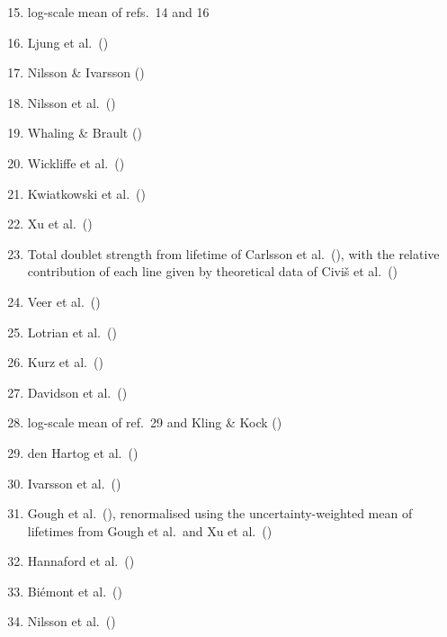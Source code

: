 \documentclass[traditabstract]{aa}
\begin{document}
\begin{minipage}[t]{0.43\linewidth}
\vspace{0pt}
\begin{enumerate}
\setcounter{enumi}{14}
\item log-scale mean of refs.\ 14 and 16
\item Ljung et al.\ (\cite{ljung})
\item Nilsson \& Ivarsson (\cite{nils2})
\item Nilsson et al.\ (\cite{nils})
\item Whaling \& Brault (\cite{whal2})
\item Wickliffe et al.\ (\cite{wick})
\item Kwiatkowski et al.\ (\cite{kwia1})
\item Xu et al.\ (\cite{xu})
\item Total doublet strength from lifetime of Carlsson et al.\ (\cite{carl2}), with the relative contribution of each line given by theoretical data of Civi\v{s} et al.\ (\cite{civis})
\item Veer et al.\ (\cite{veer})
\item Lotrian et al.\ (\cite{lotri})
\item Kurz et al.\ (\cite{Kurz})
\item Davidson et al.\ (\cite{davi})
\item log-scale mean of ref.\ 29 and Kling \& Kock (\cite{klin})  
\item den Hartog et al.\ (\cite{denh})
\item Ivarsson et al.\ (\cite{ivar})
\item Gough et al.\ (\cite{gough}), renormalised using the uncertainty-weighted mean of lifetimes from Gough et al.\ and Xu et al.\ (\cite{xu2})
\item Hannaford et al.\ (\cite{hann4})
\item Bi\'emont et al.\ (\cite{biem6})
\item Nilsson et al.\ (\cite{nils3})
\end{enumerate}
\end{minipage}
\vspace{6mm}
\end{document}
